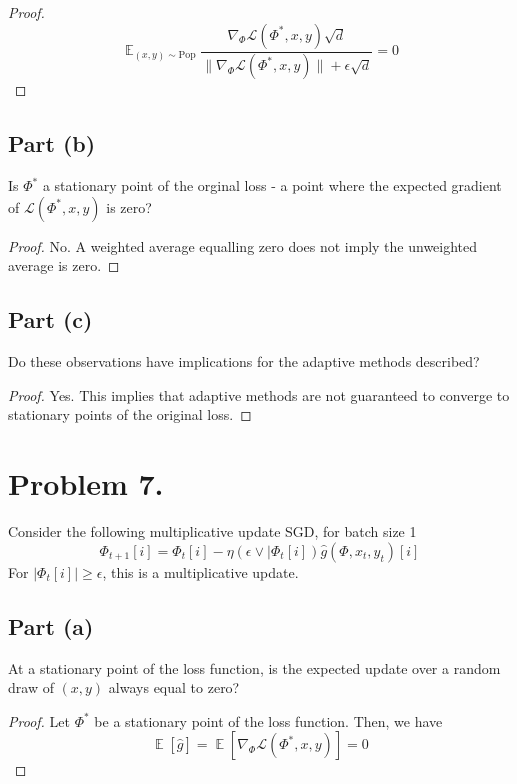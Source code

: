 \documentclass{amsart}
\newcommand{\cL}{\mathcal{L}}
\DeclareMathOperator{\ee}{\mathbb{E}}
\theoremstyle{definition}
\begin{document}
\begin{proof}
    \[
    \ee_{(x, y) \sim \mathrm{Pop}} \frac{\nabla_\Phi \cL(\Phi^\ast, x, y)\sqrt{d}}{\|\nabla_\Phi \cL(\Phi^\ast, x, y)\|  + \epsilon\sqrt{d}} = 0
    \]
\end{proof}

\subsection*{Part (b)} Is $\Phi^\ast$ a stationary point of the orginal loss - a point where the expected gradient of $\cL(\Phi^\ast, x, y)$ is zero?

\begin{proof}
    No. A weighted average equalling zero does not imply the unweighted average is zero.
\end{proof}

\subsection*{Part (c)} Do these observations have implications for the adaptive methods described?

\begin{proof}
    Yes. This implies that adaptive methods are not guaranteed to converge to stationary points of the original loss. 
\end{proof}

\section*{Problem 7.}
Consider the following multiplicative update SGD, for batch size 1
\[
\Phi_{t + 1}[i] = \Phi_t[i] - \eta (\epsilon \lor |\Phi_t[i]) \hat{g}(\Phi, x_t, y_t) [i]
\]
For $|\Phi_t[i]| \ge \epsilon$, this is a multiplicative update. 

\subsection*{Part (a)} At a stationary point of the loss function, is the expected update over a random draw of $(x, y)$ always equal to zero?
\begin{proof}
    Let $\Phi^\ast$ be a stationary point of the loss function. Then, we have
    \[
    \ee[\hat{g}] = \ee[\nabla_\Phi \cL(\Phi^\ast, x, y)] = 0
    \]
\end{proof}
\end{document}

